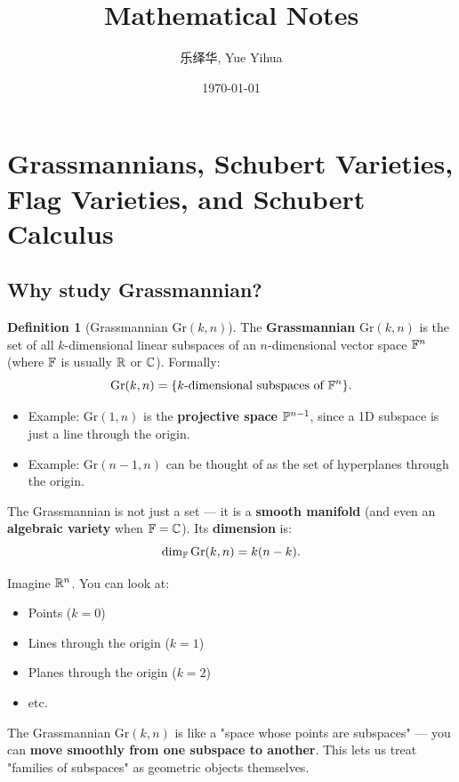 \documentclass{amsart}
\author{乐绎华, Yue Yihua}
\date{\today}
\title{Mathematical Notes}
\let\originalmathbb\mathbb
\renewcommand{\mathbb}[1]{%
    \ifstrequal{#1}{1}{\mathbbm{#1}}{\originalmathbb{#1}}%
}
\theoremstyle{plain}
\theoremstyle{definition}
\newtheorem{definition}[theorem]{Definition}
\theoremstyle{remark}
\begin{document}
\maketitle
\tableofcontents

\section{Grassmannians, Schubert Varieties, Flag Varieties, and Schubert Calculus}

\subsection{Why study Grassmannian?}

\begin{definition}[Grassmannian $\mathrm{Gr}(k, n)$]
The \textbf{Grassmannian} $\mathrm{Gr}(k, n)$ is the set of all $k$-dimensional linear subspaces of an $n$-dimensional vector space $\mathbb{F}^n$ (where $\mathbb{F}$ is usually $\mathbb{R}$ or $\mathbb{C}$).
Formally:
\[
\mathrm{Gr}(k, n) = \{ \text{\(k\)-dimensional subspaces of } \mathbb{F}^n \}.
\]	\begin{itemize}
		\item Example: $\mathrm{Gr}(1, n)$ is the \textbf{projective space} $\mathbb{P}^{n-1}$, since a 1D subspace is just a line through the origin.
		\item Example: $\mathrm{Gr}(n-1, n)$ can be thought of as the set of hyperplanes through the origin.
	\end{itemize}
The Grassmannian is not just a set — it is a \textbf{smooth manifold} (and even an \textbf{algebraic variety} when $\mathbb{F} = \mathbb{C}$).
Its \textbf{dimension} is:
\[
\dim_{\mathbb{F}} \mathrm{Gr}(k, n) = k(n-k).
\]
\end{definition}
Imagine $\mathbb{R}^n$. You can look at:

\begin{itemize}
	\item Points ($k=0$)
	\item Lines through the origin ($k=1$)
	\item Planes through the origin ($k=2$)
	\item etc.
\end{itemize}

The Grassmannian $\mathrm{Gr}(k, n)$ is like a "space whose points are subspaces" — you can \textbf{move smoothly from one subspace to another}. This lets us treat "families of subspaces" as geometric objects themselves.
\end{document}
